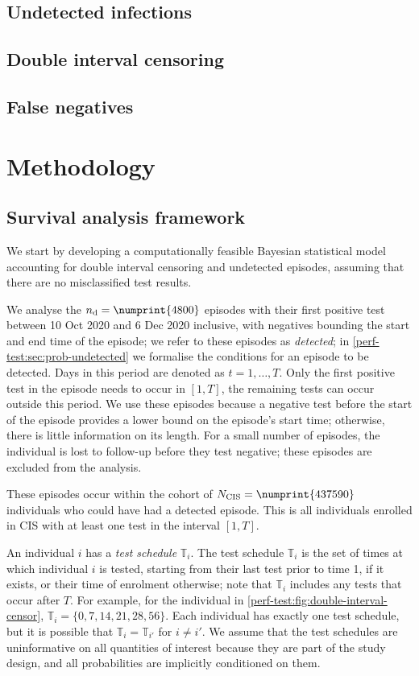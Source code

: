 \documentclass[12pt]{article}
\newcommand{\ndet}{n_\text{d}}
\newcommand{\Ncis}{N_\text{CIS}}
\newcommand{\sched}{\mathbb{T}}
\begin{document}
\subsection{Undetected infections}

\subsection{Double interval censoring} \label{perf-test:sec:interval-censoring}

\subsection{False negatives}

\section{Methodology}

\subsection{Survival analysis framework}

We start by developing a computationally feasible Bayesian statistical model accounting for double interval censoring and undetected episodes, assuming that there are no misclassified test results.

We analyse the $\ndet = \numprint{4800}$ episodes with their first positive test between 10 Oct 2020 and 6 Dec 2020 inclusive, with negatives bounding the start and end time of the episode; we refer to these episodes as \emph{detected}; in \cref{perf-test:sec:prob-undetected} we formalise the conditions for an episode to be detected.
Days in this period are denoted as $t = 1, \dots, T$.
Only the first positive test in the episode needs to occur in $[1, T]$, the remaining tests can occur outside this period.
We use these episodes because a negative test before the start of the episode provides a lower bound on the episode's start time; otherwise, there is little information on its length.
For a small number of episodes, the individual is lost to follow-up before they test negative; these episodes are excluded from the analysis.

These episodes occur within the cohort of $\Ncis = \numprint{437590}$ individuals who could have had a detected episode.
This is all individuals enrolled in CIS with at least one test in the interval $[1, T]$.

An individual $i$ has a \emph{test schedule} $\sched_i$.
The test schedule $\sched_i$ is the set of times at which individual $i$ is tested, starting from their last test prior to time 1, if it exists, or their time of enrolment otherwise; note that $\sched_i$ includes any tests that occur after $T$.
For example, for the individual in \cref{perf-test:fig:double-interval-censor}, $\sched_i = \{ 0, 7, 14, 21, 28, 56 \}$.
Each individual has exactly one test schedule, but it is possible that $\sched_i = \sched_{i'}$ for $i \neq i'$.
We assume that the test schedules are uninformative on all quantities of interest because they are part of the study design, and all probabilities are implicitly conditioned on them.
\end{document}
